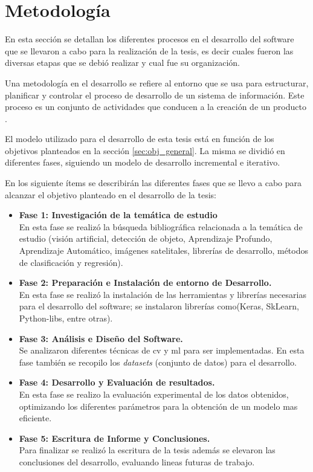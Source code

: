 \section{Metodología}\label{sec:metodologia}
En esta sección se detallan los diferentes procesos en el desarrollo del software que se llevaron a cabo para la realización de la tesis, es decir cuales fueron las diversas etapas que se debió realizar y cual fue su organización.

Una metodología en el desarrollo se refiere al entorno que se usa para estructurar, planificar y controlar el proceso de desarrollo de un sistema de información. Este proceso es un conjunto de actividades que conducen a la creación de un producto \citep{sommerville}.


El modelo utilizado para el desarrollo de esta tesis está en función de los objetivos planteados en la sección \ref{sec:obj_general}. La misma se dividió en diferentes fases, siguiendo un modelo de desarrollo incremental e iterativo.

En los siguiente ítems se describirán las diferentes fases que se llevo a cabo para alcanzar el objetivo planteado en el desarrollo de la tesis:
\begin{itemize}
	\item \textbf{Fase 1: Investigación de la temática de estudio}\\
	En esta fase se realizó la búsqueda bibliográfica relacionada a la temática de estudio (visión artificial, detección de objeto, 
	Aprendizaje Profundo, Aprendizaje Automático, imágenes satelitales, librerías de desarrollo, métodos de clasificación y regresión).
	\item \textbf{Fase 2: Preparación e Instalación de entorno de Desarrollo.}\\
	En esta fase se realizó la instalación de las herramientas y librerías necesarias para el desarrollo del software; se instalaron librerías  
como(Keras, SkLearn, Python-libs, entre otras).
	\item \textbf{Fase 3: Análisis e Diseño del Software.}\\
	Se analizaron diferentes técnicas de \ac{cv} y \ac{ml} para ser implementadas. En esta fase también se recopilo los \textit{datasets} (conjunto de datos) para el desarrollo.
	\item \textbf{Fase 4: Desarrollo y Evaluación de resultados.}\\
	En esta fase se realizo la evaluación experimental de los datos obtenidos, optimizando los diferentes parámetros para la obtención de un 
modelo mas eficiente.
	\item \textbf{Fase 5: Escritura de Informe y Conclusiones.}\\
	Para finalizar se realizó la escritura de la tesis además se elevaron las conclusiones del desarrollo, evaluando lineas futuras de trabajo.
\end{itemize}


